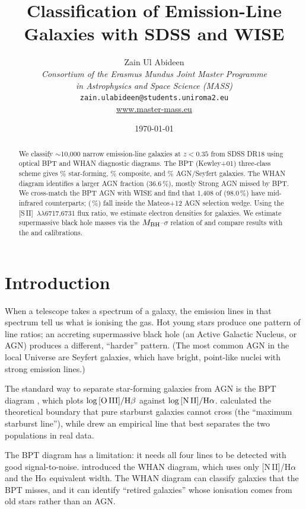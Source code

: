 \documentclass[a4paper,12pt]{article}
\title{Classification of Emission-Line Galaxies with SDSS and WISE}
\date{\today}
\author{Zain Ul Abideen\\[2pt]
  \small\textit{Consortium of the Erasmus Mundus Joint Master Programme}\\
  \small\textit{in Astrophysics and Space Science (MASS)}\\[2pt]
  \small\texttt{zain.ulabideen@students.uniroma2.eu}\\[2pt]
  \small\url{www.master-mass.eu}}
\begin{document}

\maketitle

\begin{abstract}
We classify $\sim$10,000 narrow emission-line galaxies at $z < 0.35$ from SDSS DR18
using optical BPT and WHAN diagnostic diagrams.  The BPT (Kewley+01) three-class
scheme gives \bptSfPct{}\% star-forming, \bptCompPct{}\% composite, and \bptAgnPct{}\% AGN/Seyfert
galaxies.  The WHAN diagram identifies a larger AGN fraction (36.6\,\%), mostly
Strong AGN missed by BPT.  We cross-match the BPT AGN with WISE and find that
1,408 of \wiseAgnSample{} (98.0\,\%) have mid-infrared counterparts; \wiseWedge{} (\wiseWedgePct{}\,\%) fall
inside the Mateos+12 AGN selection wedge.  Using the [S\,II]~$\lambda\lambda$6717,6731
flux ratio, we estimate electron densities for \neValid{} galaxies. We estimate
supermassive black hole masses via the $M_{\rm BH}$--$\sigma$ relation of
\citet{tremaine2002} and compare results with the \citet{gebhardt2000} and \citet{wu2009} calibrations.
\end{abstract}

\section{Introduction}

When a telescope takes a spectrum of a galaxy, the emission lines in that
spectrum tell us what is ionising the gas.  Hot young stars produce one
pattern of line ratios; an accreting supermassive black hole (an Active
Galactic Nucleus, or AGN) produces a different, ``harder'' pattern.
(The most common AGN in the local Universe are Seyfert galaxies, which
have bright, point-like nuclei with strong emission lines.)

The standard way to separate star-forming galaxies from AGN is the BPT
diagram \citep{baldwin1981,veilleux1987}, which plots
$\log\,[{\rm O\,III}]/{\rm H}\beta$ against
$\log\,[{\rm N\,II}]/{\rm H}\alpha$.  \citet{kewley2001} calculated the
theoretical boundary that pure starburst galaxies cannot cross (the
``maximum starburst line''), while \citet{kauffmann2003} drew an empirical
line that best separates the two populations in real data.

The BPT diagram has a limitation: it needs all four lines to be detected
with good signal-to-noise.  \citet{cidfernandes2011} introduced the WHAN
diagram, which uses only [N\,II]/H$\alpha$ and the H$\alpha$ equivalent
width.  The WHAN diagram can classify galaxies that the BPT misses, and
it can identify ``retired galaxies'' whose ionisation comes from old
stars rather than an AGN.
\end{document}
